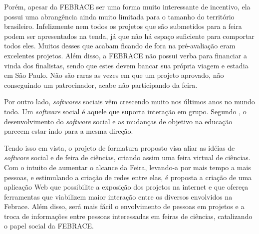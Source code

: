 Porém, apesar da FEBRACE ser uma forma muito interessante de incentivo, ela possui uma abrangência ainda muito limitada para o tamanho do território brasileiro. Infelizmente nem todos os projetos que são submetidos para a feira podem ser apresentados na tenda, já que não há espaço suficiente para comportar todos eles. Muitos desses que acabam ficando de fora na pré-avaliação eram excelentes projetos. Além disso, a FEBRACE não possui verba para financiar a vinda dos finalistas, sendo que estes devem bancar sua própria viagem e estadia em São Paulo. Não são raras as vezes em que um projeto aprovado, não conseguindo um patrocinador, acabe não participando da feira.

Por outro lado, \textit{softwares} sociais vêm crescendo muito nos últimos anos no mundo todo. Um \textit{software} social é aquele que suporta interação em grupo. Segundo \cite{futurelab06}, o desenvolvimento do \textit{software} social e as mudanças de objetivo na educação parecem estar indo para a mesma direção.

Tendo isso em vista, o projeto de formatura proposto visa aliar as idéias de \textit{software} social e de feira de ciências, criando assim uma feira virtual de ciências. Com o intuito de aumentar o alcance da Feira, levando-a por mais tempo a mais pessoas, e estimulando a criação de redes entre elas, é proposta a criação de uma aplicação Web que possibilite a exposição dos projetos na internet e que ofereça ferramentas que viabilizem maior interação entre os diversos envolvidos na Febrace. Além disso, será mais fácil o envolvimento de pessoas em projetos e a troca de informações entre pessoas interessadas em feiras de ciências, catalizando o papel social da FEBRACE.
